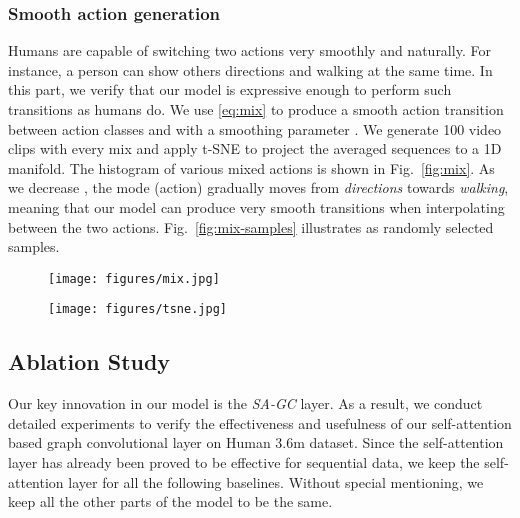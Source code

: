 \documentclass[runningheads]{llncs}
\begin{document}
\subsubsection{Smooth action generation}
Humans are capable of switching two actions very smoothly and naturally. 
For instance, a person can show others directions and walking at the same time. 
In this part, we verify that our model is expressive enough to perform such transitions as humans do. We use \eqref{eq:mix} to produce a smooth action transition between action classes  and  with a smoothing parameter . 
We generate 100 video clips with every mix and apply t-SNE \cite{maaten2008visualizing} to project the averaged sequences to a 1D manifold. The histogram of various mixed actions is shown in Fig.~\ref{fig:mix}. As we decrease , the mode (action) gradually moves from \textit{directions} towards \textit{walking}, meaning that our model can produce very smooth transitions when interpolating between the two actions. Fig.~\ref{fig:mix-samples} illustrates as randomly selected samples.



\begin{figure}[!t]
    \begin{minipage}{.4\textwidth}
        \centering
        \texttt{[image: figures/mix.jpg]}
        \label{fig:mix}
    \end{minipage}\hfill
    \begin{minipage}{.4\textwidth}
        \centering
        \texttt{[image: figures/tsne.jpg]}
        \label{fig:traject}
    \end{minipage}
\end{figure}

\subsection{Ablation Study} \label{sec:ablation}
Our key innovation in our model is the {\it SA-GC} layer. As a result, we conduct detailed experiments to verify the effectiveness and usefulness of our self-attention based graph convolutional layer on Human 3.6m dataset. Since the self-attention layer has already been proved to be effective for sequential data, we keep the self-attention layer for all the following baselines. Without special mentioning, we keep all the other parts of the model to be the same.
\end{document}
